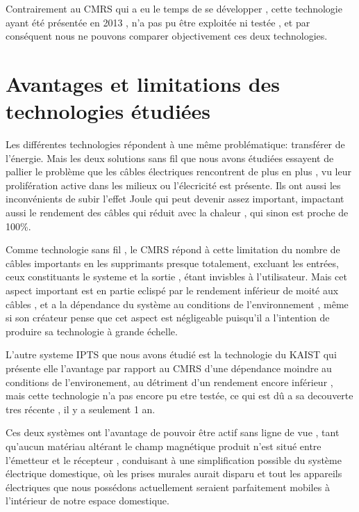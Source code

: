 \documentclass[12pt]{report}
\begin{document}
  Contrairement au CMRS qui a eu le temps de se développer , cette technologie ayant été présentée en 2013 , n'a pas pu être exploitée ni testée , et par conséquent nous ne pouvons comparer objectivement ces deux technologies.
\section{Avantages et limitations des technologies étudiées}
  Les différentes technologies répondent à une même problématique: transférer de l'énergie. Mais les deux solutions sans fil que nous avons étudiées essayent de pallier le problème que les câbles électriques rencontrent de plus en plus , vu leur prolifération active dans les milieux ou l'élecricité est présente. Ils ont aussi les inconvénients de subir l'effet Joule qui peut devenir assez important, impactant aussi le rendement des câbles qui réduit avec la chaleur , qui sinon est proche de 100\%.

  Comme technologie sans fil , le CMRS répond à cette limitation du nombre de câbles importants en les supprimants presque totalement, excluant les entrées, ceux constituants le systeme et la sortie , étant invisbles à l'utilisateur. Mais cet aspect important est en partie eclispé par le rendement inférieur de moité aux câbles , et a la dépendance du système au conditions de l'environnement , même si son créateur pense que cet aspect est négligeable puisqu'il a l'intention de produire sa technologie à grande échelle.
  
  L'autre systeme IPTS que nous avons étudié est la technologie du KAIST qui présente elle l'avantage par rapport au CMRS d'une dépendance moindre au conditions de l'environement, au détriment d'un rendement encore inférieur , mais cette technologie n'a pas encore pu etre testée, ce qui est dû a sa decouverte tres récente , il y a seulement 1 an.
  
  Ces deux systèmes ont l'avantage de pouvoir être actif sans ligne de vue , tant qu'aucun matériau altérant le champ magnétique produit n'est situé entre l'émetteur et le récepteur , conduisant à une simplification possible du système électrique domestique, où les prises murales aurait disparu et tout les appareils électriques que nous possédons actuellement seraient parfaitement mobiles à l'intérieur de notre espace domestique.
  
\end{document}
